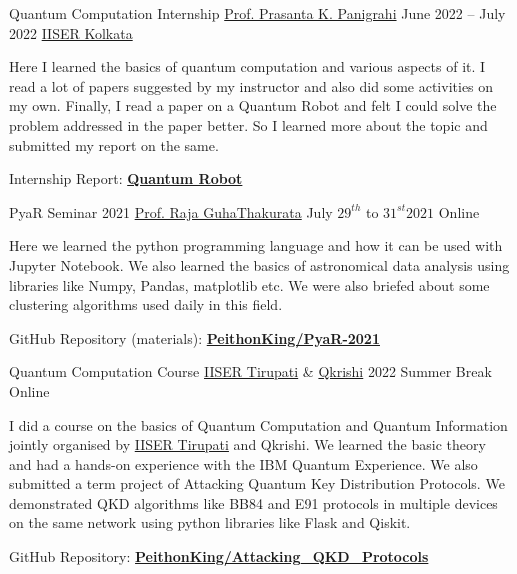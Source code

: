 
	\cvevent
	{Quantum Computation Internship}
	{\href{https://www.iiserkol.ac.in/web/en/people/faculty/dps/pprasanta/}{Prof. Prasanta K. Panigrahi}}
	{June 2022 -- July 2022}
	{\href{https://www.iiserkol.ac.in/web/en/}{IISER Kolkata}}

	\begin{justify}
		\hspace{5mm} Here I learned the basics of quantum computation and various aspects of it. I read a lot of papers suggested by my instructor and also did some activities on my own. Finally, I read a paper on a Quantum Robot and felt I could solve the problem addressed in the paper better. So I learned more about the topic and submitted my report on the same.

		Internship Report: \href{https://github.com/PeithonKing/Quantum_Robot_LaTEX/blob/main/quantum_robot_internship_report.pdf}{\textbf{Quantum Robot}}
	\end{justify}
	\divider


	\cvevent
	{PyaR Seminar 2021}
	{\href{https://www.astro.ucsc.edu/faculty/index.php?uid=pguhatha}{Prof. Raja GuhaThakurata}}
	{July $29^{th}$ to $31^{st} 2021$}
	{Online}

	\begin{justify}
		\hspace{5mm} Here we learned the python programming language and how it can be used with Jupyter Notebook. We also learned the basics of astronomical data analysis using libraries like Numpy, Pandas, matplotlib etc. We were also briefed about some clustering algorithms used daily in this field.

		GitHub Repository (materials): \href{https://github.com/PeithonKing/PyaR-2021}{\textbf{PeithonKing/PyaR-2021}}
	\end{justify}
	\divider


	\cvevent
	{Quantum Computation Course}
	{\href{http://www.iisertirupati.ac.in/}{IISER Tirupati} \& \href{https://qkrishi.com/}{Qkrishi}}
	{2022 Summer Break}
	{Online}

	\begin{justify}
		\hspace{5mm} I did a course on the basics of Quantum Computation and Quantum Information jointly organised by \href{http://www.iisertirupati.ac.in/}{IISER Tirupati} and Qkrishi. We learned the basic theory and had a hands-on experience with the IBM Quantum Experience. We also submitted a term project of Attacking Quantum Key Distribution Protocols. We demonstrated QKD algorithms like BB84 and E91 protocols in multiple devices on the same network using python libraries like Flask and Qiskit.

		GitHub Repository: \href{https://github.com/PeithonKing/Attacking_QKD_Protocols}{\textbf{PeithonKing/Attacking\_QKD\_Protocols}}
	\end{justify}


